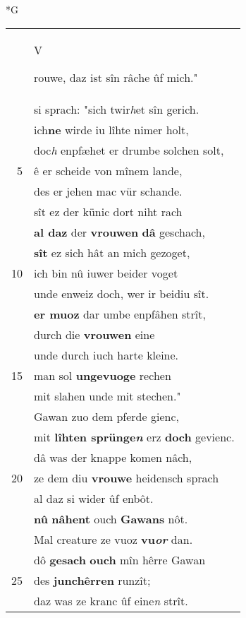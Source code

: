 \documentclass[8pt,a4paper,notitlepage]{article}
\begin{document}
\begin{table}[ht]
\begin{minipage}[t]{0.5\linewidth}
\small
\begin{center}*G
\end{center}
\begin{tabular}{rl}
 & \begin{large}V\end{large}rouwe, daz ist sîn râche ûf mich."\\ 
 & si sprach: "sich twir\textit{h}et sîn gerich.\\ 
 & ich\textbf{ne} wirde iu lîhte nimer holt,\\ 
 & doc\textit{h} enpfæhet er drumbe solchen solt,\\ 
5 & ê er scheide von mînem lande,\\ 
 & des er jehen mac vür schande.\\ 
 & sît ez der künic dort niht rach\\ 
 & \textbf{al daz} der \textbf{vrouwen} \textbf{dâ} geschach,\\ 
 & \textbf{sît} ez sich hât an mich gezoget,\\ 
10 & ich bin nû iuwer beider voget\\ 
 & unde enweiz doch, wer ir beidiu sît.\\ 
 & \textbf{er muoz} dar umbe enpfâhen strît,\\ 
 & durch die \textbf{vrouwen} eine\\ 
 & unde durch iuch harte kleine.\\ 
15 & man sol \textbf{ungevuoge} rechen\\ 
 & mit slahen unde mit stechen."\\ 
 & Gawan zuo dem pferde gienc,\\ 
 & mit \textbf{lîhten sprünge\textit{n}} erz \textbf{doch} gevienc.\\ 
 & dâ was der knappe komen nâch,\\ 
20 & ze dem diu \textbf{vrouwe} heidensch sprach\\ 
 & al daz si wider ûf enbôt.\\ 
 & \textbf{nû} \textbf{nâhent} ouch \textbf{Gawans} nôt.\\ 
 & Mal creature ze vuoz \textbf{vu\textit{or}} dan.\\ 
 & dô \textbf{gesach} \textbf{ouch} mîn hêrre Gawan\\ 
25 & des \textbf{junchêrren} runzît;\\ 
 & daz was ze kranc ûf eine\textit{n} strît.\\ 

\end{tabular}
\end{minipage}
\end{table}
\end{document}
